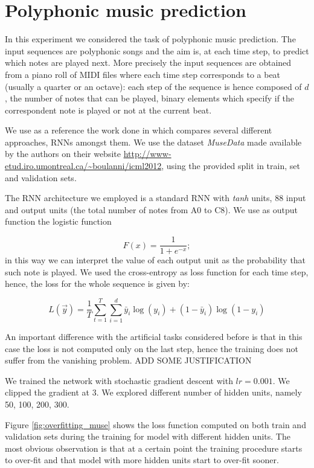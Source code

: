  
\section{Polyphonic music prediction}

In this experiment we considered the task of polyphonic music prediction. The input sequences are polyphonic songs and the aim is, at each time step, to predict which notes are played next. More precisely the input sequences are obtained from a piano roll of MIDI files where each time step corresponds to a beat (usually a quarter or an octave): each step of the sequence is hence composed of $d$, the number of notes that can be played,  binary elements which specify if the correspondent note is played or not at the current beat.

We use as a reference the work done in \cite{BoulangerMuse} which compares several different approaches, RNNs amongst them. We use the dataset \textsl{MuseData} made available by the authors on their website
\url{http://www-etud.iro.umontreal.ca/~boulanni/icml2012}, using the provided split in train, set and validation sets.

The RNN architecture we employed is a standard RNN with \textit{tanh} units, 88 input and output units (the total number of notes from A0 to C8). We use as output function the logistic function

\begin{equation}
	F(x)=\frac{1}{1+e^{-x}};
\end{equation}
in this way we can interpret the value of each output unit as the probability that such note is played. We used the cross-entropy as loss function for each time step, hence, the loss for the whole sequence is given by:

\begin{equation}
	L(\vec{y}) = \frac{1}{T}\sum_{t=1}^{T}\sum_{i=1}^{d} \bar{y}_i \log(y_i) + (1-\bar{y}_i)\log(1-y_i)
\end{equation}

An important difference with the artificial tasks considered before is that in this case the loss is not computed only on the last step, hence the training does not suffer from the vanishing problem. ADD SOME JUSTIFICATION

We trained the network with stochastic gradient descent with $lr=0.001$. We clipped the gradient at $3$. We explored different number of hidden units, namely 50, 100, 200, 300.

Figure \ref{fig:overfitting_muse} shows the loss function computed on both train and validation sets during the training for model with different hidden units. The most obvious observation is that at a certain point the training procedure starts to over-fit and that model with more hidden units start to over-fit sooner.

